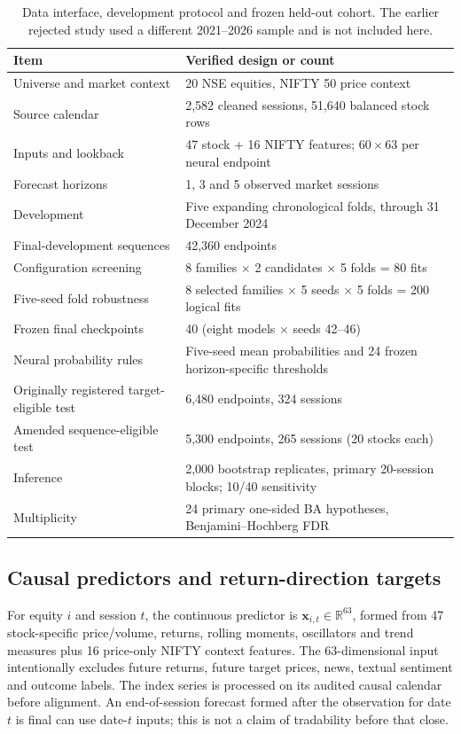\documentclass[fleqn,10pt]{wlscirep}
\begin{document}
\begin{table}[htbp]\centering\small
\caption{Data interface, development protocol and frozen held-out cohort. The earlier rejected study used a different 2021--2026 sample and is not included here.}\label{tab:design}
\begin{tabularx}{\textwidth}{@{}p{}X@{}}\toprule
Item & Verified design or count \\ \midrule
Universe and market context & 20 NSE equities, NIFTY 50 price context \\
Source calendar & 2,582 cleaned sessions, 51,640 balanced stock rows \\
Inputs and lookback & 47 stock + 16 NIFTY features; $60\times63$ per neural endpoint \\
Forecast horizons & 1, 3 and 5 observed market sessions \\
Development & Five expanding chronological folds, through 31 December 2024 \\
Final-development sequences & 42,360 endpoints \\
Configuration screening & 8 families $\times$ 2 candidates $\times$ 5 folds = 80 fits \\
Five-seed fold robustness & 8 selected families $\times$ 5 seeds $\times$ 5 folds = 200 logical fits \\
Frozen final checkpoints & 40 (eight models $\times$ seeds 42--46) \\
Neural probability rules & Five-seed mean probabilities and 24 frozen horizon-specific thresholds \\
Originally registered target-eligible test & 6,480 endpoints, 324 sessions \\
Amended sequence-eligible test & 5,300 endpoints, 265 sessions (20 stocks each) \\
Inference & 2,000 bootstrap replicates, primary 20-session blocks; 10/40 sensitivity \\
Multiplicity & 24 primary one-sided BA hypotheses, Benjamini--Hochberg FDR \\
\bottomrule\end{tabularx}
\end{table}

\subsection{Causal predictors and return-direction targets}
For equity $i$ and session $t$, the continuous predictor is $\mathbf{x}_{i,t}\in\mathbb{R}^{63}$, formed from 47 stock-specific price/volume, returns, rolling moments, oscillators and trend measures plus 16 price-only NIFTY context features. The 63-dimensional input intentionally excludes future returns, future target prices, news, textual sentiment and outcome labels. The index series is processed on its audited causal calendar before alignment. An end-of-session forecast formed after the observation for date $t$ is final can use date-$t$ inputs; this is not a claim of tradability before that close.
\end{document}

